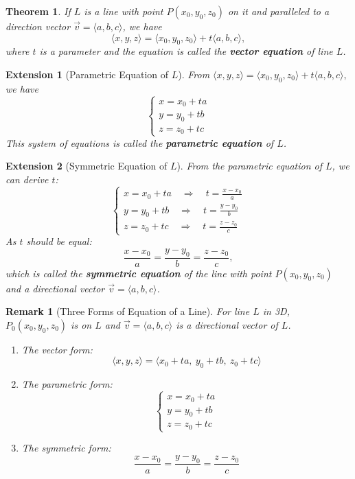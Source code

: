 \documentclass[12pt,a4paper]{article}
\newtheorem{thm}{Theorem}[subsection]
\newtheorem*{rmk}{\indent Remark}
\newtheorem*{ext}{\indent Extension}
\def\vecv{\vec{v}}
\begin{document}
\begin{thm}
	If $L$ is a line with point $P(x_0,y_0,z_0)$ on it and paralleled to a direction vector $\vecv=\langle a,b,c\rangle$, we have \[\langle x,y,z\rangle=\langle x_0,y_0,z_0\rangle+t\langle a,b,c\rangle,\] where $t$ is a parameter and the equation is called the \textbf{vector equation} of line $L$.	
\end{thm}
\begin{ext}[Parametric Equation of $L$]
	From $\langle x,y,z\rangle=\langle x_0,y_0,z_0\rangle+t\langle a,b,c\rangle,$ we have \[\begin{cases}x=x_0+ta\\y=y_0+tb\\z=z_0+tc\end{cases}\] This system of equations is called the \textbf{parametric equation} of $L$.
\end{ext}
\begin{ext}[Symmetric Equation of $L$]
	From the parametric equation of $L$, we can derive $t$: 
	\[\begin{cases}x=x_0+ta\quad\Longrightarrow\quad t=\frac{x-x_0}{a}\\y=y_0+tb\quad\Longrightarrow\quad t=\frac{y-y_0}{b}\\z=z_0+tc\quad\Longrightarrow\quad t=\frac{z-z_0}{c}\end{cases}\] As $t$ should be equal: \[\frac{x-x_0}{a}=\frac{y-y_0}{b}=\frac{z-z_0}{c},\] which is called the \textbf{symmetric equation} of the line with point $P(x_0,y_0,z_0)$ and a directional vector $\vecv=\langle a,b,c\rangle$.
\end{ext}
\begin{rmk}[Three Forms of Equation of a Line]
	For line $L$ in 3D, $P_0(x_0,y_0,z_0)$ is on $L$ and $\vecv=\langle a,b,c\rangle$ is a directional vector of $L$.
	\begin{enumerate}
		\item The vector form: \[\langle x,y,z\rangle=\langle x_0+ta,\ y_0+tb,\ z_0+tc\rangle\]
		\item The parametric form: \[\begin{cases}x=x_0+ta\\y=y_0+tb\\z=z_0+tc\end{cases}\]
		\item The symmetric form: \[\frac{x-x_0}{a}=\frac{y-y_0}{b}=\frac{z-z_0}{c}\]	
	\end{enumerate}
\end{rmk}
\end{document}
